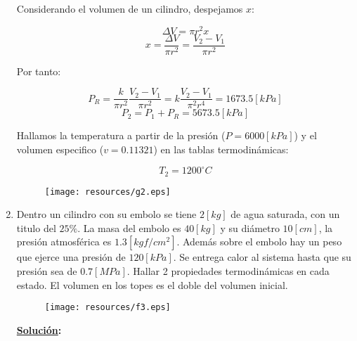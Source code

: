 \documentclass[letter,11pt]{article}
\begin{document}
\begin{enumerate}
Considerando el volumen de un cilindro, despejamos $x$:

\begin{equation*}
    \Delta V=\pi r^2 x
\end{equation*}
\begin{equation*}
    x=\frac{\Delta V}{\pi r^2}=\frac{V_2-V_1}{\pi r^2}
\end{equation*}

Por tanto:

\begin{equation*}
    P_R=\frac{k}{\pi r^2}\frac{V_2-V_1}{\pi r^2}=k\frac{V_2-V_1}{\pi^2 r^4}=1673.5[kPa]
\end{equation*}
\begin{equation*}
    P_2=P_1+P_R=5673.5[kPa]
\end{equation*}

Hallamos la temperatura a partir de la presión ($P=6000[kPa]$) y el volumen especifico ($v=0.11321$) en las tablas termodinámicas:

\begin{equation*}
    T_2=1200^\circ C
\end{equation*}

\begin{figure}[!h]
\centering
\texttt{[image: resources/g2.eps]}
\end{figure}
\vspace{1.0cm}

\newpage

\item Dentro un cilindro con su embolo se tiene $2[kg]$ de agua saturada, con un
titulo del $25\%$. La masa del embolo es $40[kg]$ y su diámetro $10[cm]$, la
presión atmosférica es $1.3[kgf/cm^2]$. Además sobre el embolo hay un peso que
ejerce una presión de $120[kPa]$. Se entrega calor al sistema hasta que su
presión sea de $0.7[MPa]$. Hallar 2 propiedades termodinámicas en cada estado.
El volumen en los topes es el doble del volumen inicial.

\vspace{0.75cm}
\begin{figure}[!h]
\centering
\texttt{[image: resources/f3.eps]}
\end{figure}
\vspace{0.75cm}

\textbf{\underline{Solución}:} \\


\end{enumerate}
\end{document}
